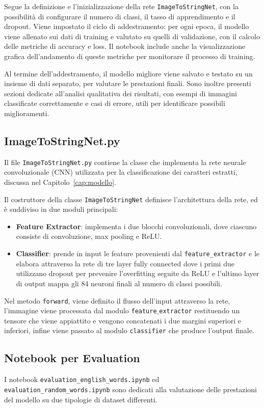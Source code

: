 Segue la definizione e l'inizializzazione della rete \texttt{ImageToStringNet}, con la possibilità di configurare il numero di classi, il tasso di apprendimento e il dropout. Viene impostato il ciclo di addestramento: per ogni epoca, il modello viene allenato sui dati di training e valutato su quelli di validazione, con il calcolo delle metriche di accuracy e loss. Il notebook include anche la visualizzazione grafica dell'andamento di queste metriche per monitorare il processo di training.

Al termine dell'addestramento, il modello migliore viene salvato e testato su un insieme di dati separato, per valutare le prestazioni finali. Sono inoltre presenti sezioni dedicate all'analisi qualitativa dei risultati, con esempi di immagini classificate correttamente e casi di errore, utili per identificare possibili miglioramenti.

\subsection{ImageToStringNet.py}
Il file \texttt{ImageToStringNet.py} contiene la classe che implementa la rete neurale convoluzionale (CNN) utilizzata per la classificazione dei caratteri estratti, discussa nel Capitolo~\ref{cap:modello}. 

Il costruttore della classe \texttt{ImageToStringNet} definisce l'architettura della rete, ed è suddiviso in due moduli principali:
\begin{itemize}
    \item \textbf{Feature Extractor}: implementa i due blocchi convoluzionali, dove ciascuno consiste di convoluzione, max pooling e ReLU.
    \item \textbf{Classifier}: prende in input le feature provenienti dal \texttt{feature\_extractor} e le elabora attraverso la rete di tre layer fully connected dove i primi due utilizzano dropout per prevenire l'overfitting seguite da ReLU e l'ultimo layer di output mappa gli 84 neuroni finali al numero di classi possibili.
\end{itemize}

Nel metodo \texttt{forward}, viene definito il flusso dell'input attraverso la rete, l'immagine viene processata dal modulo \texttt{feature$\_$extractor} restituendo un tensore che viene appiattito e vengono concatenati i due margini superiori e inferiori, infine viene passato al modulo \texttt{classifier} che produce l'output finale.

\subsection{Notebook per Evaluation}
I notebook \texttt{evaluation\_english\_words.ipynb} ed \\  \texttt{evaluation\_random\_words.ipynb} sono dedicati alla valutazione delle prestazioni del modello su due tipologie di dataset differenti. 

